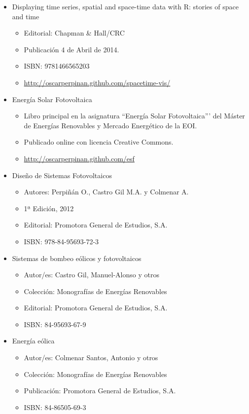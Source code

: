 \documentclass[article, a4paper]{memoir}
\begin{document}
\begin{itemize}
\item Displaying time series, spatial and space-time data with R: stories of space and time
\begin{itemize}
\item Editorial: Chapman \& Hall/CRC
\item Publicación 4 de Abril de 2014.
\item ISBN: 9781466565203
\item \url{http://oscarperpinan.github.com/spacetime-vis/}
\end{itemize}

\item Energía Solar Fotovoltaica

\begin{itemize}
\item Libro principal en la asignatura ``Energía Solar
Fotovoltaica''' del Máster de Energías Renovables y Mercado
Energético de la EOI.
\item Publicado online con licencia Creative Commons.
\item \url{http://oscarperpinan.github.com/esf}
\end{itemize}

\item Diseño de Sistemas Fotovoltaicos

\begin{itemize}
\item Autores: Perpiñán O., Castro Gil M.A. y Colmenar A.
\item 1ª Edición, 2012
\item Editorial: Promotora General de Estudios, S.A.
\item ISBN: 978-84-95693-72-3
\end{itemize}

\item Sistemas de bombeo eólicos y fotovoltaicos

\begin{itemize}
\item Autor/es: Castro Gil, Manuel-Alonso y otros
\item Colección: Monografías de Energías Renovables
\item Editorial: Promotora General de Estudios, S.A.
\item ISBN: 84-95693-67-9
\end{itemize}

\item Energía eólica

\begin{itemize}
\item Autor/es: Colmenar Santos, Antonio y otros
\item Colección: Monografías de Energías Renovables
\item Publicación: Promotora General de Estudios, S.A.
\item ISBN: 84-86505-69-3
\end{itemize}
\end{itemize}
\end{document}
